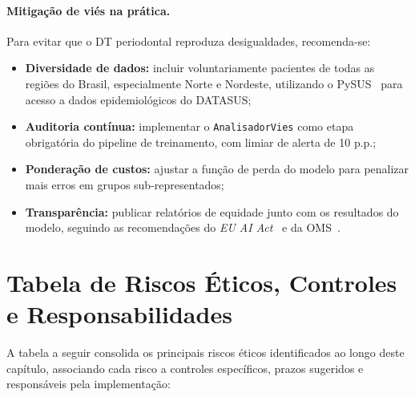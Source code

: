 \paragraph{Mitigação de viés na prática.}
Para evitar que o DT periodontal reproduza desigualdades, recomenda-se:
\begin{itemize}
    \item \textbf{Diversidade de dados:} incluir voluntariamente pacientes de todas as regiões do Brasil, especialmente Norte e Nordeste, utilizando o PySUS~\cite{pysus2024} para acesso a dados epidemiológicos do DATASUS;
    \item \textbf{Auditoria contínua:} implementar o \texttt{AnalisadorVies} como etapa obrigatória do pipeline de treinamento, com limiar de alerta de 10 p.p.;
    \item \textbf{Ponderação de custos:} ajustar a função de perda do modelo para penalizar mais erros em grupos sub-representados;
    \item \textbf{Transparência:} publicar relatórios de equidade junto com os resultados do modelo, seguindo as recomendações do \textit{EU AI Act}~\cite{euai2024} e da OMS~\cite{who2021ethics}.
\end{itemize}

\section{Tabela de Riscos Éticos, Controles e Responsabilidades}

A tabela a seguir consolida os principais riscos éticos identificados ao longo deste capítulo, associando cada risco a controles específicos, prazos sugeridos e responsáveis pela implementação:

